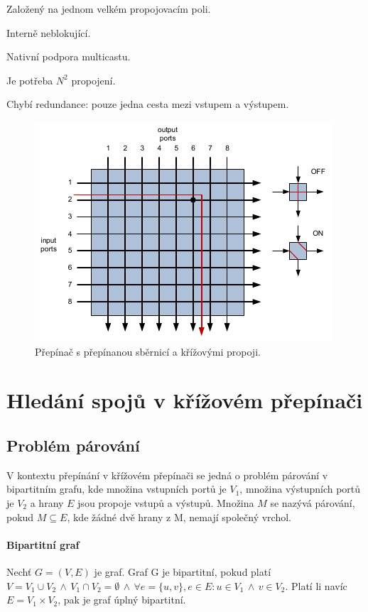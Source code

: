 \begin{compactitem}
    \item Založený na jednom velkém propojovacím poli.
    \item Interně neblokující.
    \item Nativní podpora multicastu.
    \item Je potřeba $N^2$ propojení.
    \item Chybí redundance: pouze jedna cesta mezi vstupem a výstupem.
\end{compactitem}

\begin{figure}[H]
    \centering
    \includegraphics[width=0.75\linewidth]{prepinana_deska_krizovy.pdf}
    \caption{Přepínač s přepínanou sběrnicí a křížovými propoji.}
\end{figure}


\section{Hledání spojů v křížovém přepínači}

\subsection{Problém párování}

V kontextu přepínání v křížovém přepínači se jedná o problém párování v bipartitním grafu, kde množina vstupních portů je $V_1$, množina výstupních portů je $V_2$ a hrany $E$ jsou propoje vstupů a výstupů. Množina $M$ se nazývá párování, pokud $M \subseteq E$, kde žádné dvě hrany z M, nemají společný vrchol.

\paragraph*{Bipartitní graf} Nechť $G = (V, E)$ je graf. Graf G je bipartitní, pokud platí $V = V_1 \cup V_2 \, \land \, V_1 \cap V_2 = \emptyset \, \land \, \forall e = \{u, v\}, e \in E : u \in V_1 \, \land \, v \in V_2$. Platí li navíc $E = V_1 \times V_2$, pak je graf úplný bipartitní.

